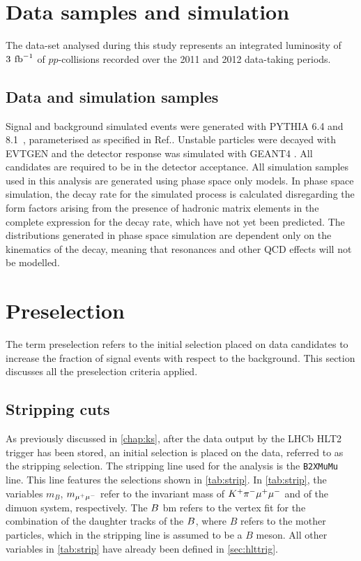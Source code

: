 \section{Data samples and simulation}\label{Sec:Exp}\label{Sec:Selection}
\label{sec:datasiminto}
The data-set analysed during this study represents an integrated luminosity of $3\:\mbox{\,fb}^{-1}$ of
$pp$-collisions recorded over the 2011 and 2012 data-taking periods. 

\subsection{Data and simulation samples}\label{Sec:Samples}
Signal and background simulated events were generated with PYTHIA 6.4 and 
8.1~\cite{pythia6,pythia8}, parameterised as 
specified in Ref.\cite{LHCb-PROC-2010-056}. Unstable particles were decayed with EVTGEN \cite{Lange:2001uf} and the detector response was simulated with 
GEANT4 \cite{Agostinelli:2002hh,LHCb-PROC-2011-006,*Allison:2006ve}. All candidates are required to be in the detector acceptance. All simulation samples used in this analysis are generated using phase space only models. In phase space simulation, the decay rate for the simulated process is calculated disregarding the form factors arising from the presence of hadronic matrix elements in the complete expression for the decay rate, which have not yet been predicted. The distributions generated in phase space simulation are dependent only on the kinematics of the decay, meaning that resonances and other QCD effects will not be modelled. 

\section{Preselection}
\label{Sec:Pre}
The term preselection refers to the initial selection placed on data candidates to increase the fraction of signal events with respect to the background.
This section discusses all the preselection criteria applied. %
\subsection{Stripping cuts}\label{Sec:Strip}
As previously discussed in \autoref{chap:ks}, after the data output by the LHCb HLT2 trigger has been stored, an initial selection is placed on the data, referred to as the stripping selection. The stripping line used for the \Lbpi analysis is the {\tt B2XMuMu} line. This line features the selections shown in \autoref{tab:strip}. In \autoref{tab:strip}, the variables $m_{B}$, $m_{{\mu^+\mu^-}}$ refer to the invariant mass of ${{K}^+}{{\pi}^-}{\mu^+\mu^-}$ and of the dimuon system, respectively. The ${B}$ \gls{bm} refers to the vertex fit for the combination of the daughter tracks of the ${B}$, where $B$ refers to the mother particles, which in the stripping line is assumed to be a $B$ meson. All other variables in \autoref{tab:strip} have already been defined in \autoref{sec:hlttrig}.%

